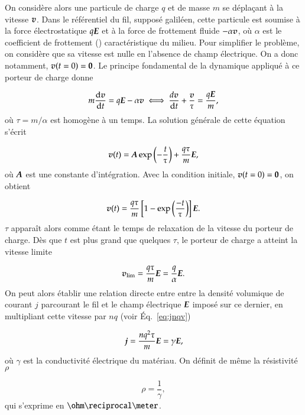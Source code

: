 On considère alors une particule de charge $q$ et de masse $m$ se déplaçant à la
vitesse $\vecv$.
Dans le référentiel du fil, supposé galiléen, cette particule est soumise à la 
force électrostatique $q\vece$ et à la force de frottement fluide $-\alpha \vecv$, 
où $\alpha$ est le coefficient de frottement (\kilogram \usk \reciprocal \second)
caractéristique du milieu. Pour simplifier le problème, 
on considère que sa vitesse est nulle en 
l'absence de champ électrique. On a donc notamment, $\vecv(t = 0) = \mitbf{0}$.
Le principe fondamental de la dynamique appliqué 
à ce porteur de charge donne

\begin{equation}
	m \dfrac{\mathrm{d}\vecv}{\dt} = q\vece - \alpha\vecv
	\iff \dfrac{d\vecv}{\dt} + \dfrac{\vecv}{\tau} = \dfrac{q\vece}{m},
\end{equation}
où $\tau = m/\alpha$ est homogène à un temps. La solution générale de cette équation
s'écrit

\begin{equation}
	\vecv(t) = \veca \exp\left(-\dfrac{t}{\tau}\right) + \dfrac{q\tau}{m}\vece,
\end{equation}
où $\veca$ est une constante d'intégration. Avec la condition initiale,
$\vecv(t=0) = \mitbf{0}$, on obtient

\begin{equation}
	\vecv(t) = \dfrac{q \tau}{m} 
	           \left[1 - \exp\left(\dfrac{-t}{\tau}\right)\right]\vece.
\end{equation}
$\tau$ apparaît alors comme étant le temps de relaxation de la vitesse du  
porteur de charge. Dès que $t$ est plus grand que quelques $\tau$, 
le porteur de charge a atteint la vitesse limite

\begin{equation}
	\vecv_\mathrm{lim} = \dfrac{q \tau}{m} \vece = \dfrac{q}{\alpha} \vece.
\end{equation}
On peut alors établir une relation directe entre entre la densité volumique
de courant $j$ parcourant le fil et le champ électrique $\vece$ imposé sur ce dernier,
en multipliant cette vitesse par $nq$ (voir Éq.~\ref{eq:jnqv})

\begin{equation}
	\vecj = \dfrac{nq^2\tau}{m} \vece = \gamma \vece,
\end{equation}
où $\gamma$ est la conductivité électrique du matériau. On définit de même
la résistivité $\rho$

\begin{equation}
	\rho = \dfrac{1}{\gamma},
\end{equation}
qui s'exprime en $\ohm \reciprocal \meter$.

